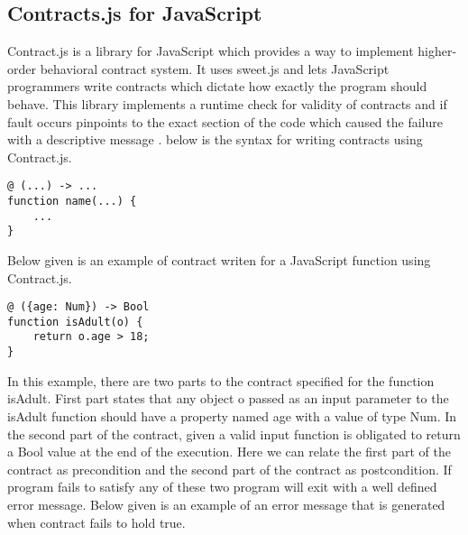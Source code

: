 \subsection{Contracts.js for JavaScript}

Contract.js is a library for JavaScript which provides a way to implement higher-order behavioral contract system. It uses sweet.js and lets JavaScript programmers write contracts which dictate how exactly the program should behave. This library implements a runtime check for validity of contracts and if fault occurs pinpoints to the exact section of the code which caused the failure with a descriptive message \cite{Contract11:online}.
below is the syntax for writing contracts using Contract.js. \linebreak

\begin{minipage}{\linewidth}
\lstset{language=Java, caption=Contract.js syntax , captionpos=b, breaklines=true}       
\begin{lstlisting}[frame=single]
@ (...) -> ...
function name(...) {
    ...
}
\end{lstlisting}
\end{minipage}

Below given is an example of contract writen for a JavaScript function using Contract.js. \linebreak


\begin{minipage}{\linewidth}
\lstset{language=Java, caption=Contract using Contract.js, captionpos=b, breaklines=true}       
\begin{lstlisting}[frame=single]
@ ({age: Num}) -> Bool
function isAdult(o) {
    return o.age > 18;
}    
\end{lstlisting}
\end{minipage}

In this example, there are two parts to the contract specified for the function isAdult. First part states that any object o passed as an input parameter to the isAdult function should have a property named age with a value of type Num. In the second part of the contract, given a valid input function is obligated to return a Bool value at the end of the execution. Here we can relate the first part of the contract as precondition and the second part of the contract as postcondition. If program fails to satisfy any of these two program will exit with a well defined error message. Below given is an example of an error message that is generated when contract fails to hold true.
\linebreak

